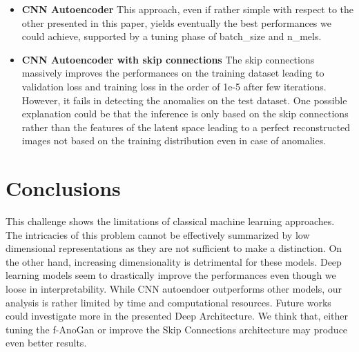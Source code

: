 \documentclass{article}
\begin{document}
\begin{itemize}
	\item \textbf{CNN Autoencoder} This approach, even if rather simple with respect to the other presented in this paper, yields eventually the best performances we could achieve, supported by a tuning phase of batch\_size and n\_mels.
	
	\item \textbf{CNN Autoencoder with skip connections} The skip connections massively improves the performances on the training dataset leading to validation loss and training loss in the order of 1e-5 after few  iterations. However, it fails in detecting the anomalies on the test dataset. One possible explanation could be that the inference is only based on the skip connections rather than the features of the latent space leading to a perfect reconstructed images not based on the training distribution even in case of anomalies.
	
\end{itemize}

\section{Conclusions}
This challenge shows the limitations of classical machine learning approaches. The intricacies of this problem cannot be effectively summarized by low dimensional representations as they are not sufficient to make a distinction. On the other hand, increasing dimensionality is detrimental for these models. Deep learning models seem to drastically improve the performances even though we loose in interpretability.
While CNN autoendoer outperforms other models, our analysis is rather limited by time and computational resources. Future works could investigate more in the presented Deep Architecture. We think that, either tuning the f-AnoGan or improve the Skip Connections architecture may produce even better results.  

\printbibliography
\end{document}
